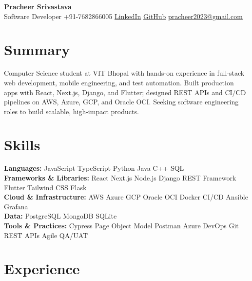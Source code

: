 \documentclass[11pt,a4paper]{article}
\begin{document}
\begin{center}
  {\LARGE\bfseries Pracheer Srivastava}\\[8pt]
  \small
  Software Developer \textbar{} +91-7682866005 \textbar{}
  \href{https://www.linkedin.com/in/pracheersrivastava}{LinkedIn} \textbar{}
  \href{https://github.com/pracheersrivastava}{GitHub} \textbar{}
  \href{mailto:pracheer2023@gmail.com}{pracheer2023@gmail.com}
\end{center}

\section{Summary}
Computer Science student at VIT Bhopal with hands-on experience in full-stack web development, mobile engineering, and test automation. Built production apps with React, Next.js, Django, and Flutter; designed REST APIs and CI/CD pipelines on AWS, Azure, GCP, and Oracle OCI. Seeking software engineering roles to build scalable, high-impact products.

\section{Skills}
\textbf{Languages:} JavaScript \textperiodcentered{} TypeScript \textperiodcentered{} Python \textperiodcentered{} Java \textperiodcentered{} C++ \textperiodcentered{} SQL\\[2pt]
\textbf{Frameworks \& Libraries:} React \textperiodcentered{} Next.js \textperiodcentered{} Node.js \textperiodcentered{} Django REST Framework \textperiodcentered{} Flutter \textperiodcentered{} Tailwind CSS \textperiodcentered{} Flask\\[2pt]
\textbf{Cloud \& Infrastructure:} AWS \textperiodcentered{} Azure \textperiodcentered{} GCP \textperiodcentered{} Oracle OCI \textperiodcentered{} Docker \textperiodcentered{} CI/CD \textperiodcentered{} Ansible \textperiodcentered{} Grafana\\[2pt]
\textbf{Data:} PostgreSQL \textperiodcentered{} MongoDB \textperiodcentered{} SQLite\\[2pt]
\textbf{Tools \& Practices:} Cypress \textperiodcentered{} Page Object Model \textperiodcentered{} Postman \textperiodcentered{} Azure DevOps \textperiodcentered{} Git \textperiodcentered{} REST APIs \textperiodcentered{} Agile \textperiodcentered{} QA/UAT

\section{Experience}
\end{document}

